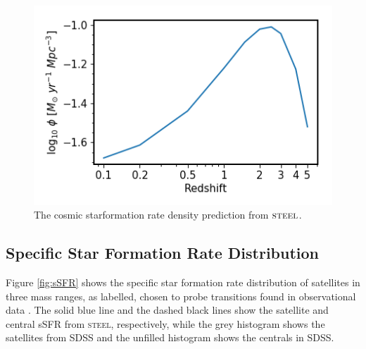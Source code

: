 \begin{figure}[h]
    \centering
    \includegraphics[width = 0.8\linewidth]{Figures/Chapter4/madau.png}
    \caption{The cosmic starformation rate density prediction from $\textsc{steel}$.}
    \label{fig:madau}
\end{figure}

\subsection{Specific Star Formation Rate Distribution}
\label{subsec:sSFR}

Figure \ref{fig:sSFR} shows the specific star formation rate distribution of satellites in three mass ranges, as labelled, chosen to probe transitions found in observational data \citep{Bernardi2011EvidenceRelations, Bernardi2014SystematicMorphology, Cappellari2013TheFunction}. The solid blue line and the dashed black lines show the satellite and central sSFR from \textsc{steel}, respectively, while the grey histogram shows the satellites from SDSS and the unfilled histogram shows the centrals in SDSS. 

